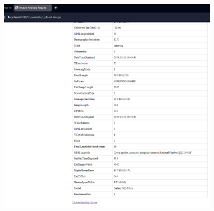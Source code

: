 \documentclass[sigconf]{acmart}
\begin{document}
\begin{figure}[H]
    \centering
    \includegraphics[width=1\linewidth]{web5.png}
    \caption{}
    \label{fig:enter-label}
\end{figure}
\end{document}
